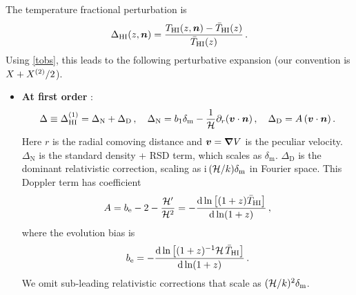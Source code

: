 {%
The temperature fractional perturbation is
\begin{equation}
\Delta_{{\mathrm{HI}}}(z,\bm{n}) = \frac{T_{{\mathrm{HI}}}(z,\bm{n}) - \bar {T}_{{\mathrm{HI}}} (z)}{\bar {T}_{{\mathrm{HI}}} (z)}\,.\label{e1.1_02}
\end{equation}
Using \eqref{tobs}, this leads to the following perturbative expansion (our convention is $X+X^{(2)}/2$).
\begin{itemize}
\item
{\bfseries At first order} \cite{Hall:2012wd}:
\begin{equation} \label{dt1}
\Delta \equiv \Delta^{(1)}_{{\mathrm{HI}}} = \Delta_{\mathrm{N}} + \Delta_{\mathrm{D}}\,,\quad  \Delta_{\mathrm{N}} = b_1\delta_{\mathrm{m}} - \frac{1}{\mathcal{H}}\partial_r(\bm{v}\cdot\bm {n} )\,,\quad \Delta_{\mathrm{D}}=A\,(\bm{v}\cdot\bm {n} ) \,.
\end{equation}
Here   $r$ is the radial comoving distance and $\bm{v}=\bm{\nabla}V$ is the peculiar velocity.
$ \Delta_{\mathrm{N}} $ is the standard density + RSD term, which scales as $\delta_{\mathrm{m}}$. $\Delta_{\mathrm{D}}$ is the dominant relativistic correction, scaling as i\,$(\mathcal{H}/k)\delta_{\mathrm{m}}$ in Fourier space. This Doppler term has coefficient
\begin{equation}
A = b_{\mathrm{e}} - 2- \frac{\mathcal{H}'}{\mathcal{H}^{2}}= - \frac{\mathrm{d} \ln \big[(1+z) \bar{T}_{{\mathrm{HI}}} \big]}{\mathrm{d} \ln (1+z)} \,,
 \label{eq:dopcoeff}
\end{equation}
where  the evolution bias is \cite{Fonseca:2015laa}
\begin{equation}
 b_{\mathrm{e}} = - \frac{\mathrm{d} \ln \big[(1+z)^{-1}\mathcal{H}\, \bar{T}_{{\mathrm{HI}}} \big] }{\mathrm{d} \ln (1+z)}\,.
\end{equation}
We omit sub-leading relativistic corrections that scale as $(\mathcal{H}/k)^2\delta_{\mathrm{m}}$. 



\end{itemize}}
